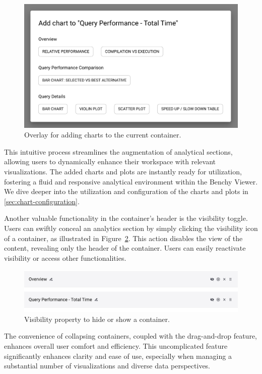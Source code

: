 \begin{figure}[h]
  \centering
  \includegraphics[width=0.6\linewidth]{figures/analytics-add-chart.png}
  \caption{Overlay for adding charts to the current container.}
  \label{fig:analytics-add-chart}
\end{figure}

This intuitive process streamlines the augmentation of analytical sections, allowing users to dynamically enhance their workspace with relevant visualizations. The added charts and plots are instantly ready for utilization, fostering a fluid and responsive analytical environment within the Benchy Viewer.\\
We dive deeper into the utilization and configuration of the charts and plots in \ref{sec:chart-configuration}.


Another valuable functionality in the container's header is the visibility toggle. Users can swiftly conceal an analytics section by simply clicking the visibility icon of a container, as illustrated in Figure~\ref{fig:analytics-section-visibility}. This action disables the view of the content, revealing only the header of the container. Users can easily reactivate visibility or access other functionalities.

\begin{figure}[h]
  \centering
  \includegraphics[width=0.8\linewidth]{figures/analytics-section-visibility.png}
  \caption{Visibility property to hide or show a container.}
  \label{fig:analytics-section-visibility}
\end{figure}

The convenience of collapsing containers, coupled with the drag-and-drop feature, enhances overall user comfort and efficiency. This uncomplicated feature significantly enhances clarity and ease of use, especially when managing a substantial number of visualizations and diverse data perspectives.

